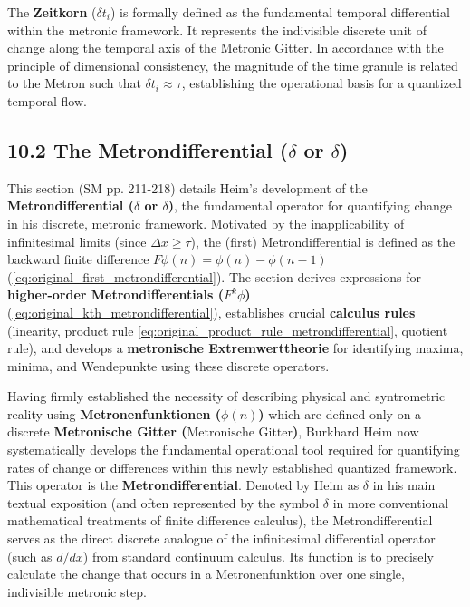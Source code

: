 \documentclass[12pt]{article}
\newcommand{\metron}{\tau}
\newcommand{\metronischegitter}{\text{Metronische Gitter}}
\newcommand{\metrondifferential}{\delta}
\newcommand{\metronenfunktion}{\phi(n)}
\newcommand{\zeitkorn}{\delta t_i}
\begin{document}
The \textbf{Zeitkorn} ($\zeitkorn$) is formally defined as the fundamental temporal differential within the metronic framework. It represents the indivisible discrete unit of change along the temporal axis of the Metronic Gitter. In accordance with the principle of dimensional consistency, the magnitude of the time granule is related to the Metron such that $\zeitkorn \approx \tau$, establishing the operational basis for a quantized temporal flow.

\subsection{10.2 The Metrondifferential (\texorpdfstring{\( \metrondifferential \)}{F} or \texorpdfstring{\( \delta \)}{delta})}
\label{sec:metrondifferential}

This section (SM pp. 211-218) details Heim's development of the \textbf{Metrondifferential (\(\metrondifferential\) or \( \delta \))}, the fundamental operator for quantifying change in his discrete, metronic framework. Motivated by the inapplicability of infinitesimal limits (since \( \Delta x \geq \metron \)), the (first) Metrondifferential is defined as the backward finite difference \( F\phi(n) = \phi(n) - \phi(n-1) \) (\eqref{eq:original_first_metrondifferential}). The section derives expressions for \textbf{higher-order Metrondifferentials (\(F^k\phi\))} (\eqref{eq:original_kth_metrondifferential}), establishes crucial \textbf{calculus rules} (linearity, product rule \eqref{eq:original_product_rule_metrondifferential}, quotient rule), and develops a \textbf{metronische Extremwerttheorie} for identifying maxima, minima, and Wendepunkte using these discrete operators.

Having firmly established the necessity of describing physical and syntrometric reality using \textbf{Metronenfunktionen (\( \metronenfunktion \))} which are defined only on a discrete \textbf{Metronische Gitter (\(\metronischegitter\))}, Burkhard Heim now systematically develops the fundamental operational tool required for quantifying rates of change or differences within this newly established quantized framework. This operator is the \textbf{Metrondifferential}. Denoted by Heim as \( \metrondifferential \) in his main textual exposition (and often represented by the symbol \( \delta \) in more conventional mathematical treatments of finite difference calculus), the Metrondifferential serves as the direct discrete analogue of the infinitesimal differential operator (such as \( d/dx \)) from standard continuum calculus. Its function is to precisely calculate the change that occurs in a Metronenfunktion over one single, indivisible metronic step.
\end{document}
